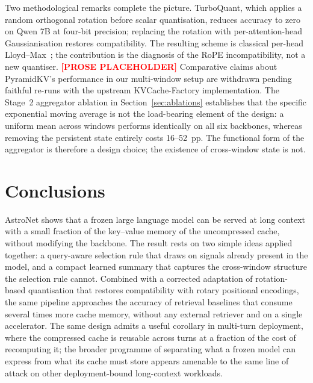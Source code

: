 \documentclass[sn-nature,Numbered]{sn-jnl}
\begin{document}
Two methodological remarks complete the picture. TurboQuant, which applies a random orthogonal rotation before scalar quantisation, reduces accuracy to zero on Qwen 7B at four-bit precision; replacing the rotation with per-attention-head Gaussianisation restores compatibility. The resulting scheme is classical per-head Lloyd--Max~\cite{lloyd1982least,max1960quantizing}; the contribution is the diagnosis of the RoPE incompatibility, not a new quantiser. \textcolor{red}{\textbf{[PROSE PLACEHOLDER]}} Comparative claims about PyramidKV's performance in our multi-window setup are withdrawn pending faithful re-runs with the upstream KVCache-Factory implementation. The Stage~2 aggregator ablation in Section~\ref{sec:ablations} establishes that the specific exponential moving average is not the load-bearing element of the design: a uniform mean across windows performs identically on all six backbones, whereas removing the persistent state entirely costs 16--52~pp. The functional form of the aggregator is therefore a design choice; the existence of cross-window state is not.


\section{Conclusions}\label{sec:conclusions}

AstroNet shows that a frozen large language model can be served at long context with a small fraction of the key--value memory of the uncompressed cache, without modifying the backbone. The result rests on two simple ideas applied together: a query-aware selection rule that draws on signals already present in the model, and a compact learned summary that captures the cross-window structure the selection rule cannot. Combined with a corrected adaptation of rotation-based quantisation that restores compatibility with rotary positional encodings, the same pipeline approaches the accuracy of retrieval baselines that consume several times more cache memory, without any external retriever and on a single accelerator. The same design admits a useful corollary in multi-turn deployment, where the compressed cache is reusable across turns at a fraction of the cost of recomputing it; the broader programme of separating what a frozen model can express from what its cache must store appears amenable to the same line of attack on other deployment-bound long-context workloads.
\end{document}
